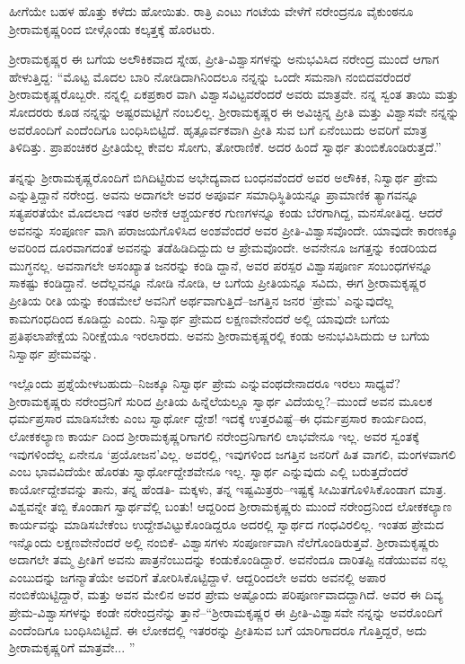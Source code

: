 ಹೀಗೆಯೇ ಬಹಳ ಹೊತ್ತು ಕಳೆದು ಹೋಯಿತು. ರಾತ್ರಿ ಎಂಟು ಗಂಟೆಯ ವೇಳೆಗೆ ನರೇಂದ್ರನೂ ವೈಕುಂಠನೂ ಶ್ರೀರಾಮಕೃಷ್ಣರಿಂದ ಬೀಳ್ಗೊಂಡು ಕಲ್ಕತ್ತಕ್ಕೆ ಹೊರಟರು.

ಶ್ರೀರಾಮಕೃಷ್ಣರ ಈ ಬಗೆಯ ಅಲೌಕಿಕವಾದ ಸ್ನೇಹ, ಪ್ರೀತಿ-ವಿಶ್ವಾಸಗಳನ್ನು ಅನುಭವಿಸಿದ ನರೇಂದ್ರ ಮುಂದೆ ಆಗಾಗ ಹೇಳುತ್ತಿದ್ದ: “ಮೊಟ್ಟ ಮೊದಲ ಬಾರಿ ನೋಡಿದಾಗಿನಿಂದಲೂ ನನ್ನನ್ನು ಒಂದೇ ಸಮನಾಗಿ ನಂಬಿದವರೆಂದರೆ ಶ್ರೀರಾಮಕೃಷ್ಣರೊಬ್ಬರೇ. ನನ್ನಲ್ಲಿ ಏಕಪ್ರಕಾರ ವಾಗಿ ವಿಶ್ವಾಸವಿಟ್ಟವರೆಂದರೆ ಅವರು ಮಾತ್ರವೇ. ನನ್ನ ಸ್ವಂತ ತಾಯಿ ಮತ್ತು ಸೋದರರು ಕೂಡ ನನ್ನನ್ನು ಅಷ್ಟರಮಟ್ಟಿಗೆ ನಂಬಲಿಲ್ಲ. ಶ್ರೀರಾಮಕೃಷ್ಣರ ಈ ಅವಿಚ್ಛಿನ್ನ ಪ್ರೀತಿ ಮತ್ತು ವಿಶ್ವಾಸವೇ ನನ್ನನ್ನು ಅವರೊಂದಿಗೆ ಎಂದೆಂದಿಗೂ ಬಂಧಿಸಿಬಿಟ್ಟಿದೆ. ಹೃತ್ಪೂರ್ವಕವಾಗಿ ಪ್ರೀತಿ ಸುವ ಬಗೆ ಏನೆಂಬುದು ಅವರಿಗೆ ಮಾತ್ರ ತಿಳಿದಿತ್ತು. ಪ್ರಾಪಂಚಿಕರ ಪ್ರೀತಿಯೆಲ್ಲ ಕೇವಲ ಸೋಗು, ತೋರಾಣಿಕೆ. ಅದರ ಹಿಂದೆ ಸ್ವಾರ್ಥ ತುಂಬಿಕೊಂಡಿರುತ್ತದೆ.”

ತನ್ನನ್ನು ಶ್ರೀರಾಮಕೃಷ್ಣರೊಂದಿಗೆ ಬಿಗಿದಿಟ್ಟಿರುವ ಅಭೇದ್ಯವಾದ ಬಂಧನವೆಂದರೆ ಅವರ ಅಲೌಕಿಕ, ನಿಸ್ವಾರ್ಥ ಪ್ರೇಮ ಎನ್ನುತ್ತಿದ್ದಾನೆ ನರೇಂದ್ರ. ಅವನು ಅದಾಗಲೇ ಅವರ ಅಪೂರ್ವ ಸಮಾಧಿಸ್ಥಿತಿಯನ್ನೂ ಪ್ರಾಮಾಣಿಕ ತ್ಯಾಗವನ್ನೂ ಸತ್ಯಪರತೆಯೇ ಮೊದಲಾದ ಇತರ ಅನೇಕ ಆಶ್ಚರ್ಯಕರ ಗುಣಗಳನ್ನೂ ಕಂಡು ಬೆರಗಾಗಿದ್ದ, ಮನಸೋತಿದ್ದ. ಆದರೆ ಅವನನ್ನು ಸಂಪೂರ್ಣ ವಾಗಿ ಪರಾಜಯಗೊಳಿಸಿದ ಅಂಶವೆಂದರೆ ಅವರ ಪ್ರೀತಿ-ವಿಶ್ವಾಸವೊಂದೇ. ಯಾವುದೇ ಕಾರಣಕ್ಕೂ ಅವರಿಂದ ದೂರವಾಗದಂತೆ ಅವನನ್ನು ತಡೆಹಿಡಿದಿದ್ದುದು ಆ ಪ್ರೇಮವೊಂದೇ. ಅವನೇನೂ ಜಗತ್ತನ್ನು ಕಂಡರಿಯದ ಮುಗ್ಧನಲ್ಲ. ಅವನಾಗಲೇ ಅಸಂಖ್ಯಾತ ಜನರನ್ನು ಕಂಡಿ ದ್ದಾನೆ, ಅವರ ಪರಸ್ಪರ ವಿಶ್ವಾಸಪೂರ್ಣ ಸಂಬಂಧಗಳನ್ನೂ ಸಾಕಷ್ಟು ಕಂಡಿದ್ದಾನೆ. ಅದೆಲ್ಲವನ್ನೂ ನೋಡಿ ನೋಡಿ, ಆ ಬಗೆಯ ಪ್ರೀತಿಯನ್ನೂ ಸವಿದು, ಈಗ ಶ್ರೀರಾಮಕೃಷ್ಣರ ಪ್ರೀತಿಯ ರೀತಿ ಯನ್ನು ಕಂಡಮೇಲೆ ಅವನಿಗೆ ಅರ್ಥವಾಗುತ್ತಿದೆ–ಜಗತ್ತಿನ ಜನರ ‘ಪ್ರೇಮ’ ಎನ್ನುವುದೆಲ್ಲ ಕಾಮಗಂಧದಿಂದ ಕೂಡಿದ್ದು ಎಂದು. ನಿಸ್ವಾರ್ಥ ಪ್ರೇಮದ ಲಕ್ಷಣವೇನೆಂದರೆ ಅಲ್ಲಿ ಯಾವುದೇ ಬಗೆಯ ಪ್ರತಿಫಲಾಪೇಕ್ಷೆಯ ನಿರೀಕ್ಷೆಯೂ ಇರಲಾರದು. ಅವನು ಶ್ರೀರಾಮಕೃಷ್ಣರಲ್ಲಿ ಕಂಡು ಅನುಭವಿಸಿದುದು ಆ ಬಗೆಯ ನಿಸ್ವಾರ್ಥ ಪ್ರೇಮವನ್ನು. 

ಇಲ್ಲೊಂದು ಪ್ರಶ್ನೆಯೇಳಬಹುದು–ನಿಜಕ್ಕೂ ನಿಸ್ವಾರ್ಥ ಪ್ರೇಮ ಎನ್ನುವಂಥದೇನಾದರೂ ಇರಲು ಸಾಧ್ಯವೆ? ಶ್ರೀರಾಮಕೃಷ್ಣರು ನರೇಂದ್ರನಿಗೆ ಸುರಿದ ಪ್ರೀತಿಯ ಹಿನ್ನೆಲೆಯಲ್ಲೂ ಸ್ವಾರ್ಥ ವಿದೆಯಲ್ಲ?–ಮುಂದೆ ಅವನ ಮೂಲಕ ಧರ್ಮಪ್ರಸಾರ ಮಾಡಿಸಬೇಕು ಎಂಬ ಸ್ವಾರ್ಥೋ ದ್ದೇಶ! ಇದಕ್ಕೆ ಉತ್ತರವಿಷ್ಟೆ–ಈ ಧರ್ಮಪ್ರಸಾರ ಕಾರ್ಯದಿಂದ, ಲೋಕಕಲ್ಯಾಣ ಕಾರ್ಯ ದಿಂದ ಶ್ರೀರಾಮಕೃಷ್ಣರಿಗಾಗಲಿ ನರೇಂದ್ರನಿಗಾಗಲಿ ಲಾಭವೇನೂ ಇಲ್ಲ. ಅವರ ಸ್ವಂತಕ್ಕೆ ಇವುಗಳಿಂದೆಲ್ಲ ಏನೇನೂ ‘ಪ್ರಯೋಜನ’ವಿಲ್ಲ. ಅವರಲ್ಲಿ, ಇವುಗಳಿಂದ ಜಗತ್ತಿನ ಜನರಿಗೆ ಹಿತ ವಾಗಲಿ, ಮಂಗಳವಾಗಲಿ ಎಂಬ ಭಾವವಿದೆಯೇ ಹೊರತು ಸ್ವಾರ್ಥೋದ್ದೇಶವೇನೂ ಇಲ್ಲ. ಸ್ವಾರ್ಥ ಎನ್ನುವುದು ಎಲ್ಲಿ ಬರುತ್ತದೆಂದರೆ ಕಾರ್ಯೋದ್ದೇಶವನ್ನು ತಾನು, ತನ್ನ ಹೆಂಡತಿ- ಮಕ್ಕಳು, ತನ್ನ ಇಷ್ಟಮಿತ್ರರು–ಇಷ್ಟಕ್ಕೆ ಸೀಮಿತಗೊಳಿಸಿಕೊಂಡಾಗ ಮಾತ್ರ. ವಿಶ್ವವನ್ನೇ ತಬ್ಬಿ ಕೊಂಡಾಗ ಸ್ವಾರ್ಥವೆಲ್ಲಿ ಬಂತು! ಆದ್ದರಿಂದ ಶ್ರೀರಾಮಕೃಷ್ಣರು ಮುಂದೆ ನರೇಂದ್ರನಿಂದ ಲೋಕಕಲ್ಯಾಣ ಕಾರ್ಯವನ್ನು ಮಾಡಿಸಬೇಕೆಂಬ ಉದ್ದೇಶವಿಟ್ಟುಕೊಂಡಿದ್ದರೂ ಅದರಲ್ಲಿ ಸ್ವಾರ್ಥದ ಗಂಧವಿರಲಿಲ್ಲ. ಇಂತಹ ಪ್ರೇಮದ ಇನ್ನೊಂದು ಲಕ್ಷಣವೇನೆಂದರೆ ಅಲ್ಲಿ ನಂಬಿಕೆ- ವಿಶ್ವಾಸಗಳು ಸಂಪೂರ್ಣವಾಗಿ ನೆಲೆಗೊಂಡಿರುತ್ತವೆ. ಶ್ರೀರಾಮಕೃಷ್ಣರು ಅದಾಗಲೇ ತಮ್ಮ ಪ್ರೀತಿಗೆ ಅವನು ಪಾತ್ರನೆಂಬುದನ್ನು ಕಂಡುಕೊಂಡಿದ್ದಾರೆ. ಅವನೆಂದೂ ದಾರಿತಪ್ಪಿ ನಡೆಯುವವ ನಲ್ಲ ಎಂಬುದನ್ನು ಜಗನ್ಮಾತೆಯೇ ಅವರಿಗೆ ತೋರಿಸಿಕೊಟ್ಟಿದ್ದಾಳೆ. ಆದ್ದರಿಂದಲೇ ಅವರು ಅವನಲ್ಲಿ ಅಪಾರ ನಂಬಿಕೆಯಿಟ್ಟಿದ್ದಾರೆ, ಮತ್ತು ಅವನ ಮೇಲಿನ ಅವರ ಪ್ರೇಮ ಅಷ್ಟೊಂದು ಪರಿಪೂರ್ಣವಾದದ್ದಾಗಿದೆ. ಅವರ ಈ ದಿವ್ಯ ಪ್ರೇಮ-ವಿಶ್ವಾಸಗಳನ್ನು ಕಂಡೇ ನರೇಂದ್ರನೆನ್ನು ತ್ತಾನೆ–“ಶ್ರೀರಾಮಕೃಷ್ಣರ ಈ ಪ್ರೀತಿ-ವಿಶ್ವಾಸವೇ ನನ್ನನ್ನು ಅವರೊಂದಿಗೆ ಎಂದೆಂದಿಗೂ ಬಂಧಿಸಿಬಿಟ್ಟಿದೆ. ಈ ಲೋಕದಲ್ಲಿ ಇತರರನ್ನು ಪ್ರೀತಿಸುವ ಬಗೆ ಯಾರಿಗಾದರೂ ಗೊತ್ತಿದ್ದರೆ, ಅದು ಶ್ರೀರಾಮಕೃಷ್ಣರಿಗೆ ಮಾತ್ರವೇ... ”

